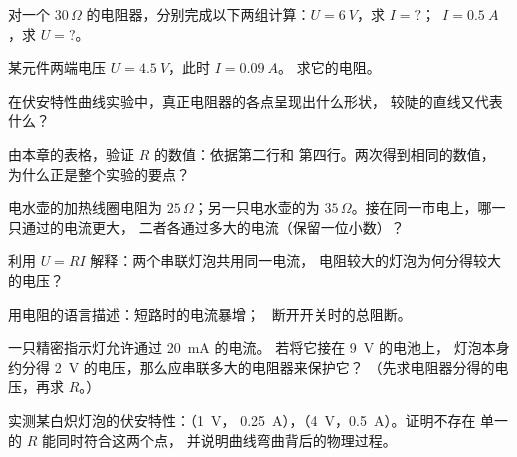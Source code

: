 \begin{exercise}[$\star$]\label{exo:g8:ohms-law:2}
对一个 $30\,\Omega$ 的电阻器，分别完成以下两组计算：$U =
\qty{6}{V}$，求 $I = {?}$；\ $I = \qty{0.5}{A}$，求 $U = {?}$。
\end{exercise}

\begin{exercise}[$\star$]\label{exo:g8:ohms-law:3}
某元件两端电压 $U = \qty{4.5}{V}$，此时 $I = \qty{0.09}{A}$。
求它的电阻。
\end{exercise}

\begin{exercise}[$\star$]\label{exo:g8:ohms-law:4}
在伏安特性曲线实验中，真正电阻器的各点呈现出什么形状，
较陡的直线又代表什么？
\end{exercise}

\begin{exercise}[$\star$]\label{exo:g8:ohms-law:5}
由本章的表格，验证 $R$ 的数值：依据第二行和
第四行。两次得到相同的数值，
为什么正是整个实验的要点？
\end{exercise}

\begin{exercise}[$\star$]\label{exo:g8:ohms-law:6}
电水壶的加热线圈电阻为 $25\,\Omega$；另一只电水壶的为
$35\,\Omega$。接在同一市电上，哪一只通过的电流更大，
二者各通过多大的电流（保留一位小数）？
\end{exercise}

\begin{exercise}[$\star$]\label{exo:g8:ohms-law:7}
利用 $U = R I$ 解释：两个串联灯泡共用同一电流，
电阻较大的灯泡为何分得较大的电压？
\end{exercise}

\begin{exercise}[$\star$]\label{exo:g8:ohms-law:8}
用电阻的语言描述：短路时的电流暴增；
\ 断开开关时的总阻断。
\end{exercise}

\begin{exercise}[$\star\star$]\label{exo:g8:ohms-law:9}
一只精密指示灯允许通过 \qty{20}{mA} 的电流。
若将它接在 \qty{9}{V} 的电池上，
灯泡本身约分得 \qty{2}{V} 的电压，那么应串联多大的电阻器来保护它？
（先求电阻器分得的电压，再求 $R$。）
\end{exercise}

\begin{exercise}[$\star\star$]\label{exo:g8:ohms-law:10}
实测某白炽灯泡的伏安特性：（\qty{1}{V}，
\qty{0.25}{A}），（\qty{4}{V}，\qty{0.5}{A}）。证明不存在
单一的 $R$ 能同时符合这两个点，
并说明曲线弯曲背后的物理过程。
\end{exercise}

